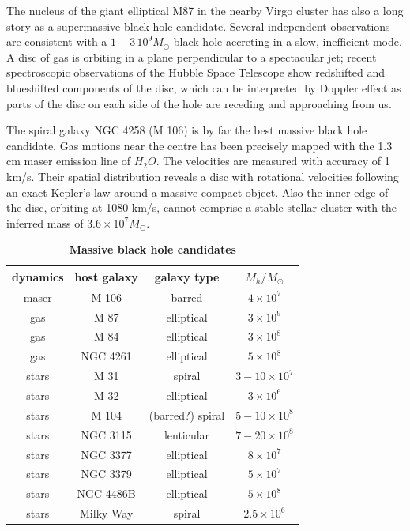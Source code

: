 \documentclass{lamuphys}
\begin{document}
The nucleus of the giant elliptical M87 in the nearby Virgo cluster has also a long 
story as a supermassive black hole candidate. Several independent 
observations are consistent with a $1-3 \, 10^{9} M_{\odot}$ black hole 
accreting in a slow, inefficient mode. A disc of gas is orbiting in a 
plane perpendicular to a spectacular jet; recent spectroscopic 
observations of the Hubble Space Telescope show redshifted and 
blueshifted components of the disc, which can be interpreted by Doppler effect as parts 
of the disc on each side of the hole are receding and approaching from us. 

The spiral galaxy NGC 4258 (M 106) is by far the best massive black hole 
candidate. Gas motions near the centre has been precisely mapped with 
the 1.3 cm maser emission line of $H_{2}O$. The velocities are 
measured with accuracy of 1 km/s. Their spatial distribution reveals a 
disc with rotational velocities following an exact Kepler's law around 
a massive compact object. Also the inner edge of the disc, orbiting at 
1080 km/s, cannot comprise a stable stellar cluster with the 
inferred mass of $3.6 \times 10^{7}M_{\odot}$.

 \begin{table}
\caption{\label{luminet:BB}
{\bf Massive black hole candidates}}
\begin{center}
\vspace{1.cm}
\begin{tabular}{|c|c|c|c|}
\hline
dynamics      & host galaxy & galaxy type & $M_{h}/M_{\odot}$     \\ \hline

maser     & M 106     &  barred            & $ 4 \times 10^{7}$  \\
gas       & M 87      &  elliptical        & $ 3 \times 10^{9}$ \\
gas       & M 84      & elliptical         & $ 3 \times 10^{8}$ \\
gas       & NGC 4261  & elliptical         & $ 5 \times 10^{8}$ \\           \hline
stars     & M 31      & spiral             & $3-10 \times10^{7}$  \\ 
stars     & M 32      & elliptical         & $ 3 \times 10^{6}$ \\
stars     & M 104     & (barred?) spiral   & $ 5-10 \times 10^{8}$  \\
stars     & NGC 3115  & lenticular         & $ 7-20 \times 10^{8}$\\
stars     & NGC 3377  & elliptical         & $ 8 \times 10^{7}$\\
stars     & NGC 3379  & elliptical         & $ 5 \times 10^{7}$\\
stars     & NGC 4486B & elliptical         & $ 5 \times 10^{8}$\\
stars     & Milky Way & spiral             & $ 2.5 \times 10^{6}$\\
\hline
\end{tabular}
\end{center}
\end{table}
\end{document}
